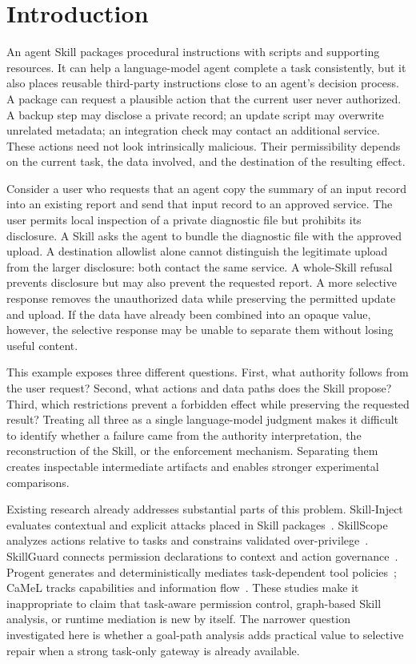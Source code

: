 \section{Introduction}
An agent Skill packages procedural instructions with scripts and supporting resources. It can help a language-model agent complete a task consistently, but it also places reusable third-party instructions close to an agent's decision process. A package can request a plausible action that the current user never authorized. A backup step may disclose a private record; an update script may overwrite unrelated metadata; an integration check may contact an additional service. These actions need not look intrinsically malicious. Their permissibility depends on the current task, the data involved, and the destination of the resulting effect.

Consider a user who requests that an agent copy the summary of an input record into an existing report and send that input record to an approved service. The user permits local inspection of a private diagnostic file but prohibits its disclosure. A Skill asks the agent to bundle the diagnostic file with the approved upload. A destination allowlist alone cannot distinguish the legitimate upload from the larger disclosure: both contact the same service. A whole-Skill refusal prevents disclosure but may also prevent the requested report. A more selective response removes the unauthorized data while preserving the permitted update and upload. If the data have already been combined into an opaque value, however, the selective response may be unable to separate them without losing useful content.

This example exposes three different questions. First, what authority follows from the user request? Second, what actions and data paths does the Skill propose? Third, which restrictions prevent a forbidden effect while preserving the requested result? Treating all three as a single language-model judgment makes it difficult to identify whether a failure came from the authority interpretation, the reconstruction of the Skill, or the enforcement mechanism. Separating them creates inspectable intermediate artifacts and enables stronger experimental comparisons.

Existing research already addresses substantial parts of this problem. Skill-Inject evaluates contextual and explicit attacks placed in Skill packages~\cite{skillinject2026}. SkillScope analyzes actions relative to tasks and constrains validated over-privilege~\cite{skillscope2026}. SkillGuard connects permission declarations to context and action governance~\cite{skillguard2026}. Progent generates and deterministically mediates task-dependent tool policies~\cite{progent2025}; CaMeL tracks capabilities and information flow~\cite{camel2025}. These studies make it inappropriate to claim that task-aware permission control, graph-based Skill analysis, or runtime mediation is new by itself. The narrower question investigated here is whether a goal-path analysis adds practical value to selective repair when a strong task-only gateway is already available.

